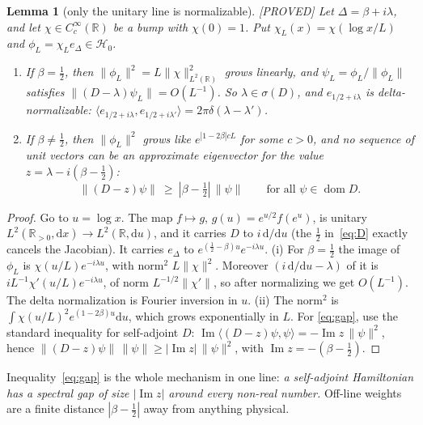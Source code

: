 \documentclass[11pt,a4paper]{article}
\theoremstyle{plain}
\newtheorem{lemma}[theorem]{Lemma}
\theoremstyle{definition}
\theoremstyle{remark}
\newcommand{\R}{\mathbb{R}}
\newcommand{\cH}{\mathcal{H}}
\newcommand{\dd}{\mathrm{d}}
\newcommand{\Rp}{\R_{>0}}
\newcommand{\lab}[1]{\textsf{\small[#1]}}
\newcommand{\PROVED}{\lab{PROVED}}
\renewcommand{\Im}{\operatorname{Im}}
\begin{document}
\begin{lemma}[only the unitary line is normalizable]\label{lem:norm}
\PROVED{} Let $\Delta=\beta+i\lambda$, and let $\chi\in C_c^\infty(\R)$ be a
bump with $\chi(0)=1$. Put $\chi_L(x)=\chi(\log x/L)$ and
$\phi_L=\chi_L e_\Delta\in\cH_0$.
\begin{enumerate}[label=(\roman*)]
\item If $\beta=\tfrac12$, then $\|\phi_L\|^2=L\|\chi\|^2_{L^2(\R)}$ grows
linearly, and $\psi_L=\phi_L/\|\phi_L\|$ satisfies
$\|(D-\lambda)\psi_L\|=O(L^{-1})$. So $\lambda\in\sigma(D)$, and
$e_{1/2+i\lambda}$ is delta-normalizable:
$\langle e_{1/2+i\lambda},e_{1/2+i\lambda'}\rangle=2\pi\delta(\lambda-\lambda')$.
\item If $\beta\neq\tfrac12$, then $\|\phi_L\|^2$ grows like
$e^{|1-2\beta|cL}$ for some $c>0$, and no sequence of unit vectors can be an
approximate eigenvector for the value $z=\lambda-i(\beta-\tfrac12)$:
\begin{equation}\label{eq:gap}
\|(D-z)\psi\|\ \ge\ |\beta-\tfrac12|\,\|\psi\|\qquad\text{for all }\psi\in\operatorname{dom}D .
\end{equation}
\end{enumerate}
\end{lemma}
\begin{proof}
Go to $u=\log x$. The map $f\mapsto g$, $g(u)=e^{u/2}f(e^u)$, is unitary
$L^2(\Rp,\dd x)\to L^2(\R,\dd u)$, and it carries $D$ to $i\,\dd/\dd u$ (the
$\tfrac12$ in~\eqref{eq:D} exactly cancels the Jacobian). It carries
$e_\Delta$ to $e^{(\frac12-\beta)u}e^{-i\lambda u}$. (i) For $\beta=\tfrac12$
the image of $\phi_L$ is $\chi(u/L)e^{-i\lambda u}$, with norm$^2$
$L\|\chi\|^2$. Moreover $(i\,\dd/\dd u-\lambda)$ of it is
$iL^{-1}\chi'(u/L)e^{-i\lambda u}$, of norm $L^{-1/2}\|\chi'\|$, so after
normalizing we get $O(L^{-1})$. The delta normalization is Fourier
inversion in $u$. (ii) The norm$^2$ is
$\int\chi(u/L)^2e^{(1-2\beta)u}\dd u$, which grows exponentially in $L$. For
\eqref{eq:gap}, use the standard inequality for self-adjoint $D$:
$\Im\langle(D-z)\psi,\psi\rangle=-\Im z\,\|\psi\|^2$, hence
$\|(D-z)\psi\|\,\|\psi\|\ge|\Im z|\,\|\psi\|^2$, with
$\Im z=-(\beta-\tfrac12)$.
\end{proof}

Inequality~\eqref{eq:gap} is the whole mechanism in one line: \emph{a
self-adjoint Hamiltonian has a spectral gap of size $|\Im z|$ around every
non-real number.} Off-line weights are a finite distance $|\beta-\tfrac12|$
away from anything physical.
\end{document}
